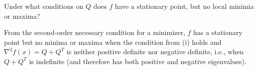 Under what conditions on $Q$ does $f$ have a stationary point, but no local minimia or maxima?

\begin{solution}
    From the second-order necessary condition for a minimizer, $f$ has a stationary point but no minima or maxima 
    when the condition from (i) holds and $\nabla^2 f(x) = Q + Q^T$ is neither positive definite nor negative definite,
    i.e., when $Q + Q^T$ is indefinite (and therefore has both positive and negative eigenvalues).
    \ \\
\end{solution}